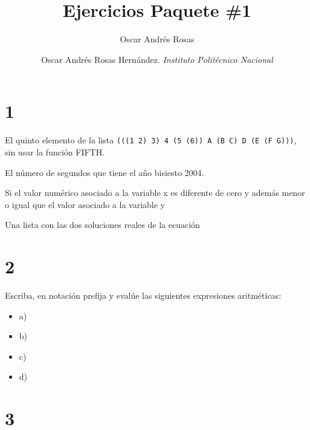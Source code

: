 \documentclass[fleqn, journal, onecolumn]{IEEEtran}             %
\author{Oscar Andrés Rosas}                                     %
\theoremstyle{break}                                            %
\begin{document}
    \title{Ejercicios Paquete \#1}
    \author{
        Oscar Andrés Rosas Hernández.
        \textit{Instituto Politécnico Nacional}
    }

    \maketitle

    \section{1}

        El quinto elemento de la lista \texttt{(((1 2) 3) 4 (5 (6)) A (B C) D (E (F G)))}, 
        sin usar la función FIFTH.

        

        El número de segundos que tiene el año bisiesto 2004.
        

        Si el valor numérico asociado a la variable x es diferente de cero y además
        menor o igual que el valor asociado a la variable y
        

        Una lista con las dos soluciones reales de la ecuación
        

    \clearpage
    \section{2}
        Escriba, en notación prefija y evalúe las siguientes expresiones aritméticas:
        \begin{itemize}
            \item a) 
            \item b) 
            \item c) 
            \item d) 
        \end{itemize}

    \section{3}
\end{document}
